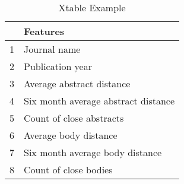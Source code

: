 \begin{table}[ht]
\centering
\caption{Xtable Example} 
\begin{tabular}{rl}
  \hline
 & Features \\ 
  \hline
1 & Journal name \\ 
  2 & Publication year \\ 
  3 & Average abstract distance \\ 
  4 & Six month average abstract distance \\ 
  5 & Count of close abstracts \\ 
  6 & Average body distance \\ 
  7 & Six month average body distance \\ 
  8 & Count of close bodies \\ 
   \hline
\end{tabular}
\end{table}
